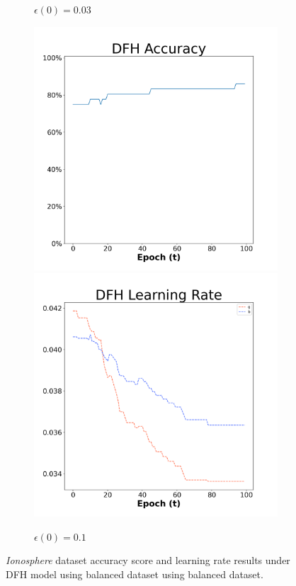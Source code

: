 \begin{figure}[H]
\begin{subfigure}{0.3\textwidth}
  \caption{$\epsilon(0)=0.03$}
\end{subfigure}\hfil %
\begin{subfigure}{0.3\textwidth}
  \includegraphics[width=\linewidth]{images/exper1/Ionosphere/DFH_0.1_acc.png}
  \includegraphics[width=\linewidth]{images/exper1/Ionosphere/DFH_0.1_lr.png}
  \caption{$\epsilon(0)=0.1$}
\end{subfigure}

\caption{\textit{Ionosphere} dataset accuracy score and learning rate results under DFH model using balanced dataset using balanced dataset.}
\end{figure}

